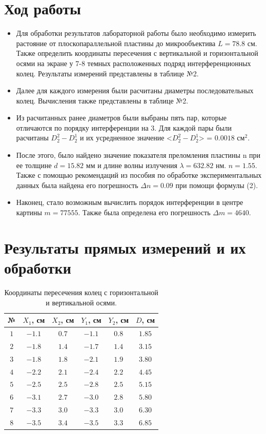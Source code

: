 \documentclass{article}
\begin{document}
\section{Ход работы}
\begin{itemize}
  \item Для обработки результатов лабораторной работы было необходимо измерить растояние от плоскопараллельной пластины до микрообъектива $L = 78.8$ см. Также определить координаты пересечения с вертикальной и горизонтальной осями на экране у 7-8 темных расположенных подряд интерференционных колец. Результаты измерений представлены в таблице №2.
  \item Далее для каждого измерения были расчитаны диаметры последовательных колец. Вычисления также представлены в таблице №2.
  \item Из расчитанных ранее диаметров были выбраны пять пар, которые отличаются по порядку интерференции на 3. Для каждой пары были расчитаны $D^{2}_{2}-D^{1}_{2}$ и их усредненное значение <$D^{2}_{2}-D^{1}_{2}$> = $0.0018$ см$^{2}$.
  \item После этого, было найдено значение показателя преломления пластины n при ее толщине $d = 15.82$ мм и длине волны излучения $\lambda = 632.82$ нм. $n = 1.55$. Также с помощью рекомендаций из пособия по обработке экспериментальных данных была найдена его погрешность $\Delta n = 0.09$ при помощи формулы (2).
  \item Наконец, стало возможным вычислить порядок интерференции в центре картины $m = 77555$. Также была определена его погрешность $\Delta m = 4640$.
\end{itemize}
\section{Результаты прямых измерений и их обработки}
\begin{table}[h]
    \centering
    \bgroup
    \def\arraystretch{1.4}
    \begin{tabular}{|c|c|c|c|c|c|}
        \hline
        № & $X_{1}$, см & $X_{2}$, см & $Y_{1}$, см & $Y_{2}$, см & $D$, см\\ \hline
        $ 1 $ & $ -1.1 $ & $ 0.7 $ & $ -1.1 $ & $ 0.8 $ & $ 1.85 $\\ \hline
        $ 2 $ & $ -1.8 $ & $ 1.4 $ & $ -1.7 $ & $ 1.4 $ & $ 3.15 $\\ \hline
        $ 3 $ & $ -1.8 $ & $ 1.8 $ & $ -2.1 $ & $ 1.9 $ & $ 3.80 $\\ \hline
        $ 4 $ & $ -2.2 $ & $ 2.1 $ & $ -2.4 $ & $ 2.2 $ & $ 4.45 $\\ \hline
        $ 5 $ & $ -2.5 $ & $ 2.5 $ & $ -2.8 $ & $ 2.5 $ & $ 5.15 $\\ \hline
        $ 6 $ & $ -3.1 $ & $ 2.7 $ & $ -3.0 $ & $ 2.8 $ & $ 5.80 $\\ \hline
        $ 7 $ & $ -3.3 $ & $ 3.0 $ & $ -3.3 $ & $ 3.0 $ & $ 6.30 $\\ \hline
        $ 8 $ & $ -3.5 $ & $ 3.4 $ & $ -3.5 $ & $ 3.3 $ & $ 6.85 $\\ \hline
    \end{tabular}
    \egroup
    \caption{Координаты пересечения колец с горизонтальной и вертикальной осями.} 
\end{table}
\newpage
\end{document}
